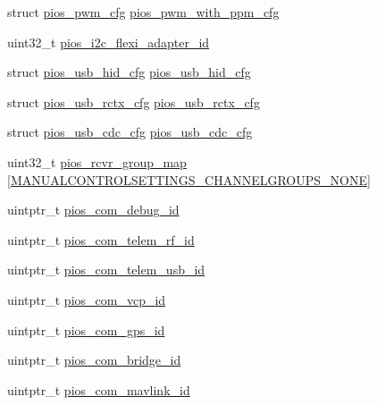\begin{DoxyCompactItemize}
\item 
struct \hyperlink{structpios__pwm__cfg}{pios\-\_\-pwm\-\_\-cfg} \hyperlink{group___copter_control_ga6a7a8338c617f18384f3b3c5678f5505}{pios\-\_\-pwm\-\_\-with\-\_\-ppm\-\_\-cfg}
\item 
uint32\-\_\-t \hyperlink{group___copter_control_ga00c59288b3ddcecb262b920ef5ae6ce1}{pios\-\_\-i2c\-\_\-flexi\-\_\-adapter\-\_\-id}
\item 
struct \hyperlink{structpios__usb__hid__cfg}{pios\-\_\-usb\-\_\-hid\-\_\-cfg} \hyperlink{group___copter_control_ga3665f6d3a2cccc431b55b9432291e94c}{pios\-\_\-usb\-\_\-hid\-\_\-cfg}
\item 
struct \hyperlink{structpios__usb__rctx__cfg}{pios\-\_\-usb\-\_\-rctx\-\_\-cfg} \hyperlink{group___copter_control_gaf4a39af8b0cf8dcab89860e8309804eb}{pios\-\_\-usb\-\_\-rctx\-\_\-cfg}
\item 
struct \hyperlink{structpios__usb__cdc__cfg}{pios\-\_\-usb\-\_\-cdc\-\_\-cfg} \hyperlink{group___copter_control_ga05cc3e449d417c7f9097d2659e6f5ca3}{pios\-\_\-usb\-\_\-cdc\-\_\-cfg}
\item 
uint32\-\_\-t \hyperlink{group___copter_control_ga6c6cfc16eb738e47c123298e062297e2}{pios\-\_\-rcvr\-\_\-group\-\_\-map} \mbox{[}\hyperlink{group___manual_control_settings_gga94e1fe696fef2f85cbdb4a2e479c7ed2af9104b4e2c50328b0912db1e10fc3074}{\-M\-A\-N\-U\-A\-L\-C\-O\-N\-T\-R\-O\-L\-S\-E\-T\-T\-I\-N\-G\-S\-\_\-\-C\-H\-A\-N\-N\-E\-L\-G\-R\-O\-U\-P\-S\-\_\-\-N\-O\-N\-E}\mbox{]}
\item 
uintptr\-\_\-t \hyperlink{group___copter_control_ga14dc9e3d330b80a37a9699c2112358e0}{pios\-\_\-com\-\_\-debug\-\_\-id}
\item 
uintptr\-\_\-t \hyperlink{group___copter_control_gae48e848f715b08971e23528feee79339}{pios\-\_\-com\-\_\-telem\-\_\-rf\-\_\-id}
\item 
uintptr\-\_\-t \hyperlink{group___copter_control_ga513cc36d72b76de2fcb75ff233a79a4a}{pios\-\_\-com\-\_\-telem\-\_\-usb\-\_\-id}
\item 
uintptr\-\_\-t \hyperlink{group___copter_control_gaaeb3e0d65ed5c6e7b921c54e1ad905db}{pios\-\_\-com\-\_\-vcp\-\_\-id}
\item 
uintptr\-\_\-t \hyperlink{group___copter_control_ga05dca72c42c6c2b33fa62b8ee0fcb2ea}{pios\-\_\-com\-\_\-gps\-\_\-id}
\item 
uintptr\-\_\-t \hyperlink{group___copter_control_gac040f05fa048688ee0269c2768698a14}{pios\-\_\-com\-\_\-bridge\-\_\-id}
\item 
uintptr\-\_\-t \hyperlink{group___copter_control_gabdefeb92517c08b2db19b764db941de9}{pios\-\_\-com\-\_\-mavlink\-\_\-id}

\end{DoxyCompactItemize}
